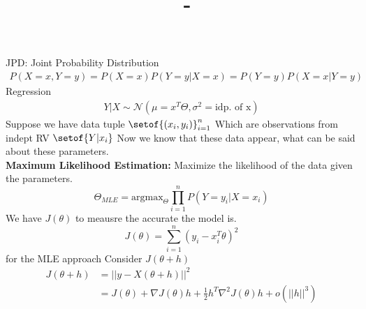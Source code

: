 \documentclass[answers,12pt,addpoints]{exam}
\author{\name}
\title{\course \ - \assignment}
\begin{document}
\maketitle


\newpage
JPD: Joint Probability Distribution
\begin{align*}
    P(X = x, Y = y) = P(X = x)P(Y = y|X = x) = P(Y = y)P(X = x|Y = y)
\end{align*}
Regression 
\begin{align*}
    Y|X \sim \mathcal{N}(\mu = x^T \Theta, \sigma^2 = \text{idp. of x}) 
\end{align*}
Suppose we have data tuple $\setof{(x_i, y_i)}_{i=1}^n$ Which are observations from indept RV $\setof{Y|x_i}$ Now we know that these data appear, what can be said about these parameters. \\
\textbf{Maximum Likelihood Estimation:}
Maximize the likelihood of the data given the parameters.
$$\Theta_{MLE} = \text{argmax}_{\Theta} \prod_{i=1}^n P(Y = y_i|X = x_i)$$
We have $J(\theta)$ to meausre the accurate the model is. \\
$$J(\theta) = \sum_{i=1}^n (y_i - x_i^T \theta)^2$$
for the MLE approach 
Consider $J(\theta + h)$
\begin{align*}
    J(\theta + h) &= ||y - X(\theta + h)||^2 \\
    &= J(\theta) + \nabla J(\theta) h + \frac{1}{2}h^T \nabla^2 J(\theta) h + o(||h||^3) \\
\end{align*} 
\newpage
\end{document}
